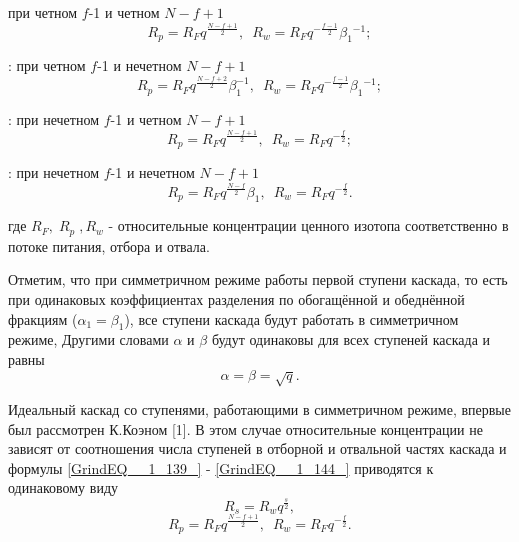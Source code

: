 \textbf{\textit{}}\underbar{:} при четном $f$-1 и четном $N-f+1$
\begin{equation} \label{GrindEQ__1_141_} 
R_{p} =R_{F} q^{\frac{N-f+1}{2} } ,\, \, \, R_{w} =R_{F} q^{-\frac{f-1}{2} } \beta _{1} {}^{-1} ; 
\end{equation} 

\textbf{\textit{}}: при четном $f$-1 и нечетном $N-f+1$
\begin{equation} \label{GrindEQ__1_142_} 
R_{p} =R_{F} q^{\frac{N-f+2}{2} } \beta _{1}^{-1} ,\, \, \, R_{w} =R_{F} q^{-\frac{f-1}{2} } \beta _{1} {}^{-1} ; 
\end{equation} 

\textbf{\textit{}}: при нечетном $f$-1 и четном $N-f+1$
\begin{equation} \label{GrindEQ__1_143_} 
R_{p} =R_{F} q^{\frac{N-f+1}{2} } ,\, \, \, R_{w} =R_{F} q^{-\frac{f}{2} } ; 
\end{equation} 

\textbf{\textit{}}: при нечетном $f$-1 и нечетном $N-f+1$
\begin{equation} \label{GrindEQ__1_144_} 
R_{p} =R_{F} q^{\frac{N-f}{2} } \beta _{1} ,\, \, \, R_{w} =R_{F} q^{-\frac{f}{2} } . 
\end{equation} 

где $R_{F} ,\; R_{p} \; ,R_{w} $ - относительные концентрации ценного изотопа соответственно в потоке питания, отбора и отвала.

 Отметим, что при симметричном режиме работы первой ступени каскада, то есть при одинаковых коэффициентах разделения по обогащённой и обеднённой фракциям ($\alpha _{1} =\beta _{1} $), все ступени каскада будут работать в симметричном режиме, Другими словами $\alpha $ и $\beta $ будут одинаковы для всех ступеней каскада и равны
\begin{equation} \label{GrindEQ__1_145_} 
\alpha =\beta =\sqrt{q} .                                 
\end{equation} 

Идеальный каскад со ступенями, работающими в симметричном режиме, впервые был рассмотрен К.Коэном [1]. В этом случае относительные концентрации не зависят от соотношения числа ступеней в отборной и отвальной частях каскада и формулы \ref{GrindEQ__1_139_} - \ref{GrindEQ__1_144_} приводятся к одинаковому виду
\begin{equation} \label{GrindEQ__1_146_} 
R_{s} =R_{w} q^{\frac{s}{2} } ,                                      
\end{equation} 
\begin{equation} \label{GrindEQ__1_147_} 
R_{p} =R_{F} q^{\frac{N-f+1}{2} } ,\, \, \, R_{w} =R_{F} q^{-\frac{f}{2} } .                
\end{equation} 

